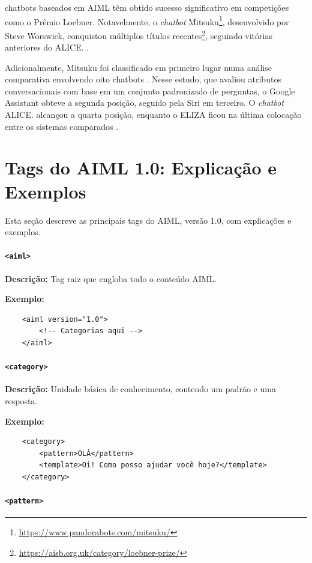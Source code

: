 \documentclass[a4paper,oneside]{book}
\begin{document}
chatbots baseados em AIML têm obtido sucesso significativo em competições como o Prêmio Loebner. Notavelmente, o \emph{chatbot} Mitsuku\footnote{\url{https://www.pandorabots.com/mitsuku/}}, desenvolvido por Steve Worswick, conquistou múltiplos títulos recentes\footnote{\url{https://aisb.org.uk/category/loebner-prize/}}, seguindo vitórias anteriores do ALICE. \cite{Wallace2000}.

Adicionalmente, Mitsuku foi classificado em primeiro lugar numa análise comparativa envolvendo oito chatbots \cite{Sharma2020}. Nesse estudo, que avaliou atributos conversacionais com base em um conjunto padronizado de perguntas, o Google Assistant obteve a segunda posição, seguido pela Siri em terceiro. O \emph{chatbot} ALICE. alcançou a quarta posição, enquanto o ELIZA ficou na última colocação entre os sistemas comparados \cite{Sharma2020}.

\section{Tags do AIML 1.0: Explicação e Exemplos}

Esta seção descreve as principais tags do AIML, versão 1.0, com explicações e exemplos.

\paragraph{\texttt{<aiml>}} 

\textbf{Descrição:} Tag raiz que engloba todo o conteúdo AIML. 

\textbf{Exemplo:}

\begin{verbatim}
	<aiml version="1.0">
		<!-- Categorias aqui -->
	</aiml>
\end{verbatim}

\paragraph{\texttt{<category>}} 

\textbf{Descrição:} Unidade básica de conhecimento, contendo um padrão e uma resposta. 

\textbf{Exemplo:}

\begin{verbatim}
	<category>
		<pattern>OLÁ</pattern>
		<template>Oi! Como posso ajudar você hoje?</template>
	</category>
\end{verbatim}

\paragraph{\texttt{<pattern>}} 
\end{document}
